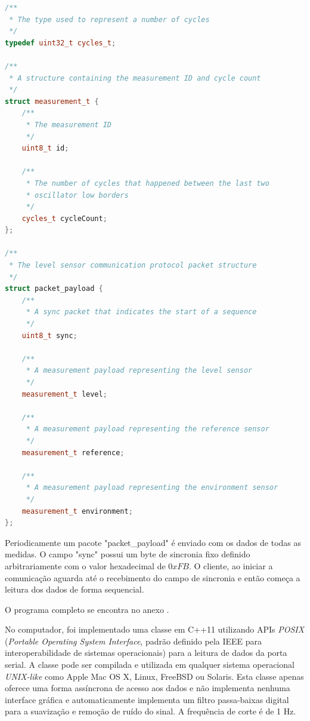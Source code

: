 \documentclass[a4paper]{instrumentacao}
\begin{document}
\begin{lstlisting}[caption=Estrutura dos pacotes de conteúdo enviados pela linha de comunicação serial, language=C++, directivestyle={\color{black}} emph={int,char,double,float,unsigned,uint8_t}, emphstyle={\color{blue}}]
/**
 * The type used to represent a number of cycles
 */
typedef uint32_t cycles_t;

/**
 * A structure containing the measurement ID and cycle count
 */
struct measurement_t {
    /**
     * The measurement ID
     */
    uint8_t id;

    /**
     * The number of cycles that happened between the last two 
     * oscillator low borders
     */
    cycles_t cycleCount;
};

/**
 * The level sensor communication protocol packet structure
 */
struct packet_payload {
    /**
     * A sync packet that indicates the start of a sequence
     */
    uint8_t sync;

    /**
     * A measurement payload representing the level sensor
     */
    measurement_t level;

    /**
     * A measurement payload representing the reference sensor
     */
	measurement_t reference;

    /**
     * A measurement payload representing the environment sensor
     */
    measurement_t environment;
};
\end{lstlisting}

Periodicamente um pacote "packet\_payload" é enviado com os dados de todas as medidas. O campo "sync" possui um byte de sincronia fixo definido arbitrariamente com o valor hexadecimal de $0xFB$. O cliente, ao iniciar a comunicação aguarda até o recebimento do campo de sincronia e então começa a leitura dos dados de forma sequencial.

O programa completo se encontra no anexo .

No computador, foi implementado uma classe em C++11 utilizando APIs \textit{POSIX} (\textit{Portable Operating System Interface}, padrão definido pela IEEE para interoperabilidade de sistemas operacionais) para a leitura de dados da porta serial. A classe pode ser compilada e utilizada em qualquer sistema operacional \textit{UNIX-like} como Apple Mac OS X, Linux, FreeBSD ou Solaris. Esta classe apenas oferece uma forma assíncrona de acesso aos dados e não implementa nenhuma interface gráfica e automaticamente implementa um filtro passa-baixas digital para a suavização e remoção de ruído do sinal. A frequência de corte é de 1 Hz.
\end{document}
